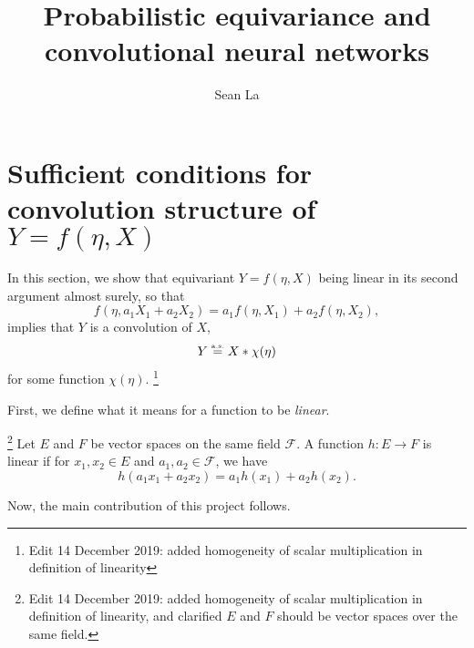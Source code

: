 \documentclass[10pt]{article}
\title{Probabilistic equivariance and convolutional neural networks} %
\author{Sean La} %
\begin{document}
\maketitle



\section{Sufficient conditions for convolution structure of $Y = f(\eta,X)$}
In this section, we show that equivariant $Y = f(\eta,X)$ being linear in its second argument almost surely, so that
$$
	f(\eta, a_1X_1 + a_2X_2) = a_1f(\eta,X_1) + a_2f(\eta,X_2),
$$
implies that $Y$ is a convolution of $X$,
$$
	Y \stackrel{\text{\rm\tiny a.s.}}{=} X * \chi(\eta)
$$
for some function $\chi(\eta)$. \footnote{Edit 14 December 2019: added homogeneity of scalar multiplication in definition of linearity}

First, we define what it means for a function to be \textit{linear}.
\begin{definition} \label{def:linear}\footnote{Edit 14 December 2019: added homogeneity of scalar multiplication in definition of linearity, and clarified $E$ and $F$ should be vector spaces over the same field.}
	Let $E$ and $F$ be vector spaces on the same field $\mathcal{F}$.	
	A function $h: E \to F$ is linear if for $x_1, x_2 \in E$ and $a_1, a_2 \in \mathcal{F}$, we have
	$$
		h(a_1x_1 + a_2x_2) = a_1h(x_1) + a_2h(x_2).
	$$ 
\end{definition}

\noindent

Now, the main contribution of this project follows.
\end{document}
